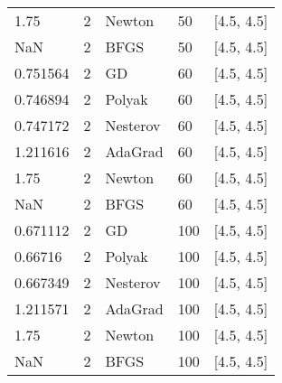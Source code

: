 \begin{tabular}{lllll}
      1.75 &        2 &   Newton &     50 &       [4.5, 4.5] \\
       NaN &        2 &     BFGS &     50 &       [4.5, 4.5] \\
  0.751564 &        2 &       GD &     60 &       [4.5, 4.5] \\
  0.746894 &        2 &   Polyak &     60 &       [4.5, 4.5] \\
  0.747172 &        2 & Nesterov &     60 &       [4.5, 4.5] \\
  1.211616 &        2 &  AdaGrad &     60 &       [4.5, 4.5] \\
      1.75 &        2 &   Newton &     60 &       [4.5, 4.5] \\
       NaN &        2 &     BFGS &     60 &       [4.5, 4.5] \\
  0.671112 &        2 &       GD &    100 &       [4.5, 4.5] \\
   0.66716 &        2 &   Polyak &    100 &       [4.5, 4.5] \\
  0.667349 &        2 & Nesterov &    100 &       [4.5, 4.5] \\
  1.211571 &        2 &  AdaGrad &    100 &       [4.5, 4.5] \\
      1.75 &        2 &   Newton &    100 &       [4.5, 4.5] \\
       NaN &        2 &     BFGS &    100 &       [4.5, 4.5] \\
\end{tabular}
